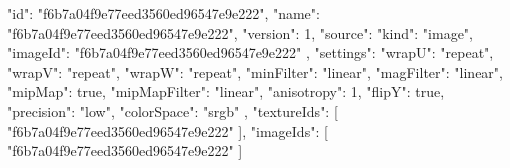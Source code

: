 {
  "id": "f6b7a04f9e77eed3560ed96547e9e222",
  "name": "f6b7a04f9e77eed3560ed96547e9e222",
  "version": 1,
  "source": {
    "kind": "image",
    "imageId": "f6b7a04f9e77eed3560ed96547e9e222"
  },
  "settings": {
    "wrapU": "repeat",
    "wrapV": "repeat",
    "wrapW": "repeat",
    "minFilter": "linear",
    "magFilter": "linear",
    "mipMap": true,
    "mipMapFilter": "linear",
    "anisotropy": 1,
    "flipY": true,
    "precision": "low",
    "colorSpace": "srgb"
  },
  "textureIds": [
    "f6b7a04f9e77eed3560ed96547e9e222"
  ],
  "imageIds": [
    "f6b7a04f9e77eed3560ed96547e9e222"
  ]
}
